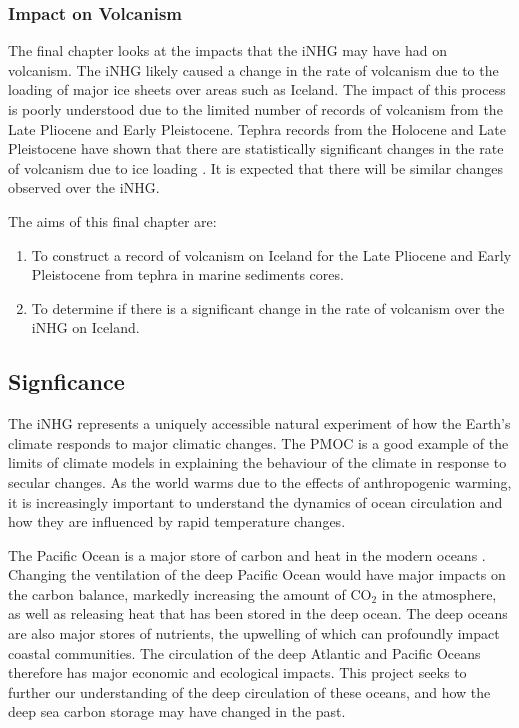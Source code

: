 \subsubsection{Impact on Volcanism}


The final chapter looks at the impacts that the iNHG may have had on volcanism. The iNHG likely caused a change in the rate of volcanism due to the loading of major ice sheets over areas such as Iceland. The impact of this process is poorly understood due to the limited number of records of volcanism from the Late Pliocene and Early Pleistocene. Tephra records from the Holocene and Late Pleistocene have shown that there are statistically significant changes in the rate of volcanism due to ice loading \citep{maclennanLinkVolcanismDeglaciation2002, sigmundssonClimateEffectsVolcanism2010, sigmundssonMultipleEffectsIce2012}. It is expected that there will be similar changes observed over the iNHG.

The aims of this final chapter are:
\begin{enumerate}
	\item To construct a record of volcanism on Iceland for the Late Pliocene and Early Pleistocene from tephra in marine sediments cores.
	\item To determine if there is a significant change in the rate of volcanism over the iNHG on Iceland.
\end{enumerate}

\subsection{Signficance}

The iNHG represents a uniquely accessible natural experiment of how the Earth’s climate responds to major climatic changes. The PMOC is a good example of the limits of climate models in explaining the behaviour of the climate in response to secular changes. As the world warms due to the effects of anthropogenic warming, it is increasingly important to understand the dynamics of ocean circulation and how they are influenced by rapid temperature changes.

The Pacific Ocean is a major store of carbon and heat in the modern oceans \citep{chengImprovedEstimatesOcean2017}. Changing the ventilation of the deep Pacific Ocean would have major impacts on the carbon balance, markedly increasing the amount of CO$_2$ in the atmosphere, as well as releasing heat that has been stored in the deep ocean. The deep oceans are also major stores of nutrients, the upwelling of which can profoundly impact coastal communities. The circulation of the deep Atlantic and Pacific Oceans therefore has major economic and ecological impacts. This project seeks to further our understanding of the deep circulation of these oceans, and how the deep sea carbon storage may have changed in the past.

